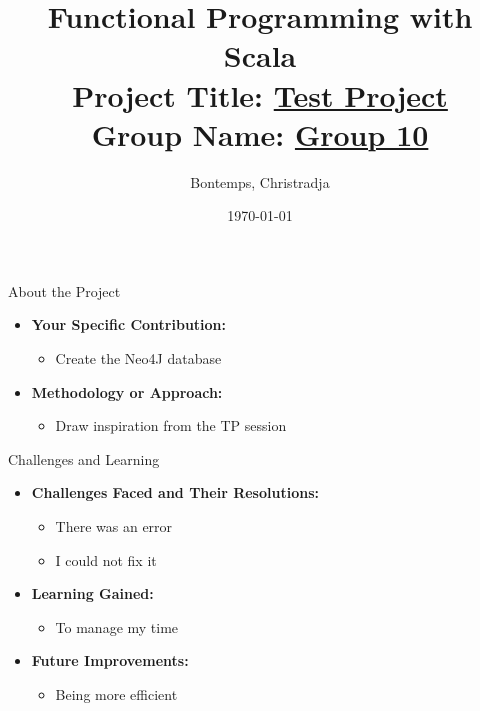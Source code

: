 \documentclass[serif, aspectratio=169]{beamer}
\title[Project Presentation]{Functional Programming with Scala \\ { \large Project Title: \underline{ Test Project  \hspace{2cm}}}\\ {\small Group Name: \underline{Group 10 \hspace{2cm} }}}
\author{Bontemps, Christradja}
\institute{ IG5\_Polytech}
\date{\small \today}
\begin{document}
\begin{frame}
    \titlepage
\end{frame}

\begin{frame}{About the Project}
    \begin{itemize}
        \item \textbf{Your Specific Contribution:}
        \begin{itemize}
            \item Create the Neo4J database
        \end{itemize}
        \medskip
        \item \textbf{Methodology or Approach:}
        \begin{itemize}
            \item Draw inspiration from the TP session
        \end{itemize}

    \end{itemize}
\end{frame}

\begin{frame}{Challenges and Learning}
    \begin{itemize}
        \item \textbf{Challenges Faced and Their Resolutions:}
        \begin{itemize}
            \item There was an error
            \item I could not fix it
        \end{itemize}
        \medskip
        \item \textbf{Learning Gained:}
        \begin{itemize}
            \item To manage my time
        \end{itemize}
        \medskip
        \item \textbf{Future Improvements:}
        \begin{itemize}
            \item Being more efficient
        \end{itemize}
    \end{itemize}
\end{frame}
\end{document}
